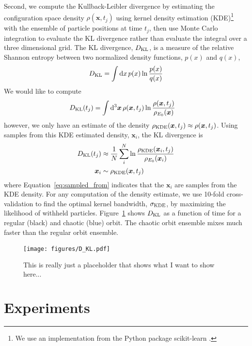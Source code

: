 \documentclass[letterpaper,12pt,preprint]{aastex}
\newcommand{\dd}{\mathrm{d}}
\newcommand{\bs}[1]{\boldsymbol{#1}}
\begin{document}
Second, we compute the Kullback-Leibler divergence \citep[KL divergence;][]{kullback51} by estimating the configuration space density $\rho(\bs{x},t_j)$ using kernel density estimation (KDE)\footnote{We use an implementation from the Python package scikit-learn \citep{scikitlearn}.} with the ensemble of particle positions at time $t_j$, then use Monte Carlo integration to evaluate the KL divergence rather than evaluate the integral over a three dimensional grid. The KL divergence, $D_{\rm KL}$, is a measure of the relative Shannon entropy between two normalized density functions, $p(x)$ and $q(x)$,
\begin{equation}
	D_{\rm KL} = \int \dd x \, p(x) \ln \frac{p(x)}{q(x)}
\end{equation}
We would like to compute 
\begin{align}
	D_{\rm KL}(t_j) &= \int \dd^3 \bs{x} \, \rho(\bs{x},t_j) \ln \frac{\rho(\bs{x},t_j)}{\rho_{E_0}(\bs{x})}
\end{align}
however, we only have an estimate of the density $\rho_{\rm KDE}(\bs{x},t_j) \approx \rho(\bs{x},t_j)$. Using samples from this KDE estimated density, $\bs{x}_i$, the KL divergence is
\begin{align}
	D_{\rm KL}(t_j) &\approx \frac{1}{N} \sum_i^N \ln \frac{\rho_{\rm KDE}(\bs{x}_i,t_j)}{\rho_{E_0}(\bs{x}_i)}\\
	\bs{x}_i &\sim \rho_{\rm KDE}(\bs{x},t_j)\label{eq:sampled_from}
\end{align}
where Equation~\ref{eq:sampled_from} indicates that the $\bs{x}_i$ are samples from the KDE density. For any computation of the density estimate, we use 10-fold cross-validation to find the optimal kernel bandwidth, $\sigma_{\rm KDE}$, by maximizing the likelihood of withheld particles. Figure~\ref{fig:DKL} shows $D_{\rm KL}$ as a function of time for a regular (black) and chaotic (blue) orbit. The chaotic orbit ensemble mixes much faster than the regular orbit ensemble.

\begin{figure}[!h]
\begin{center}
\texttt{[image: figures/D\_KL.pdf]}
\caption{This is really just a placeholder that shows what I want to show here...} \label{fig:DKL}
\end{center}
\end{figure}

\section{Experiments}
\end{document}
